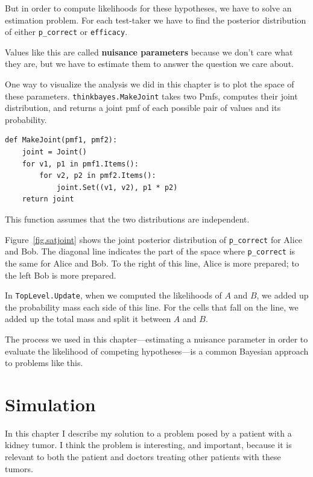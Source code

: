 \documentclass[12pt]{book}
\begin{document}
But in order to compute likelihoods for these hypotheses, we
have to solve an estimation problem.  For each test-taker
we have to find the posterior distribution of either
\verb"p_correct" or \verb"efficacy".

Values like this are called {\bf nuisance parameters} because
we don't care what they are, but we have
to estimate them to answer the question we care about.

One way to visualize the analysis we did in this chapter is
to plot the space of these parameters.  \verb"thinkbayes.MakeJoint"
takes two Pmfs, computes their joint distribution, and returns
a joint pmf of each possible pair of values and its probability.

\begin{verbatim}
def MakeJoint(pmf1, pmf2):
    joint = Joint()
    for v1, p1 in pmf1.Items():
        for v2, p2 in pmf2.Items():
            joint.Set((v1, v2), p1 * p2)
    return joint
\end{verbatim}

This function assumes that the two distributions are independent.

Figure~\ref{fig.satjoint} shows the joint posterior distribution of
\verb"p_correct" for Alice and Bob.  The diagonal line indicates the
part of the space where \verb"p_correct" is the same for Alice and
Bob.  To the right of this line, Alice is more prepared; to the left
Bob is more prepared.

In {\tt TopLevel.Update}, when we computed the likelihoods of $A$ and
$B$, we added up the probability mass each side of this line.  For the
cells that fall on the line, we added up the total mass and split it
between $A$ and $B$.

The process we used in this chapter---estimating a nuisance
parameter in order to evaluate the likelihood of competing
hypotheses---is a common Bayesian approach to problems like this.




\chapter{Simulation}

In this chapter I describe my solution to a problem posed
by a patient with a kidney tumor.  I think the problem is interesting,
and important, because it is relevant to both the patient and
doctors treating other patients with these tumors.
\end{document}
